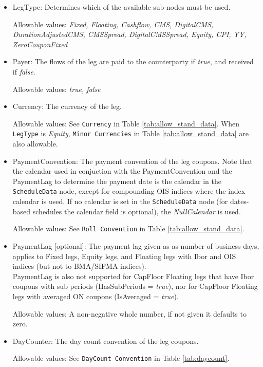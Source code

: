 \begin{itemize}
\item LegType:  Determines which of the available sub-nodes must be
  used. 

Allowable values:  \emph{Fixed, Floating, Cashflow, CMS, DigitalCMS, DurationAdjustedCMS, CMSSpread, DigitalCMSSpread, Equity, CPI, YY, ZeroCouponFixed}

\item Payer:  The flows of the leg are paid to the counterparty if
  \emph{true}, and received if \emph{false}.  

Allowable values:  \emph{true, false} 

\item Currency: The currency of the leg. 

Allowable values:  See \lstinline!Currency! in Table \ref{tab:allow_stand_data}. When \lstinline!LegType! is \emph{Equity}, \lstinline!Minor Currencies! in Table \ref{tab:allow_stand_data} are also allowable.

\item PaymentConvention: The payment convention of the leg coupons. Note that the calendar used in conjuction with the PaymentConvention and the PaymentLag to determine the payment date is the calendar in the \lstinline!ScheduleData! node, except for compounding OIS indices where the index calendar is used. If no calendar is set in the \lstinline!ScheduleData! node (for dates-based schedules the calendar field is optional), the \emph{NullCalendar} is used. 

Allowable values: See \lstinline!Roll Convention! in Table \ref{tab:allow_stand_data}.

\item PaymentLag [optional]: The payment lag given as as number of business days, applies to Fixed legs, Equity legs, and Floating legs with Ibor and OIS indices (but not to BMA/SIFMA indices). \\
PaymentLag is also not supported for CapFloor Floating legs that have Ibor coupons with sub periods (HasSubPeriods = \emph{true}), nor for CapFloor Floating legs with averaged ON coupons (IsAveraged = \emph{true}).

Allowable values: A non-negative whole number, if not given it defaults to zero.

\item DayCounter: The day count convention of the leg coupons. 

Allowable values: See \lstinline!DayCount Convention! in Table \ref{tab:daycount}.


\end{itemize}
